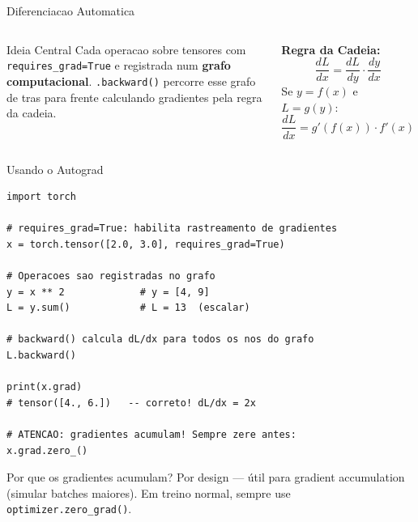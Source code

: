 \documentclass[aspectratio=169, 10pt]{beamer}
\begin{document}
\begin{frame}{Diferenciacao Automatica}
\begin{columns}
  \begin{block}{Ideia Central}
    Cada operacao sobre tensores com \texttt{requires\_grad=True} e registrada 
    num \textbf{grafo computacional}. \texttt{.backward()} percorre esse grafo 
    de tras para frente calculando gradientes pela regra da cadeia.
  \end{block}
  \vspace{0.4em}
  \textbf{Regra da Cadeia:}
  \[
    \frac{dL}{dx} = \frac{dL}{dy} \cdot \frac{dy}{dx}
  \]
  Se $y = f(x)$ e $L = g(y)$:
  \[
    \frac{dL}{dx} = g'(f(x)) \cdot f'(x)
  \]

\end{columns}
\end{frame}


\begin{frame}[fragile]{Usando o Autograd}
\begin{lstlisting}
import torch

# requires_grad=True: habilita rastreamento de gradientes
x = torch.tensor([2.0, 3.0], requires_grad=True)

# Operacoes sao registradas no grafo
y = x ** 2             # y = [4, 9]
L = y.sum()            # L = 13  (escalar)

# backward() calcula dL/dx para todos os nos do grafo
L.backward()

print(x.grad)
# tensor([4., 6.])   -- correto! dL/dx = 2x

# ATENCAO: gradientes acumulam! Sempre zere antes:
x.grad.zero_()
\end{lstlisting}

\begin{block}{Por que os gradientes acumulam?}
  Por design — útil para gradient accumulation (simular batches maiores).
  Em treino normal, sempre use \texttt{optimizer.zero\_grad()}.
\end{block}
\end{frame}
\end{document}
